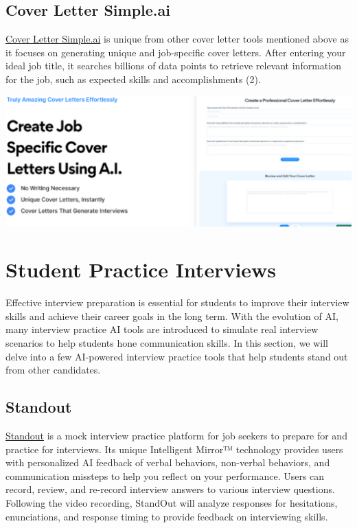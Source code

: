 \documentclass[
]{book}
\begin{document}
\hypertarget{cover-letter-simple.ai}{%
\section{Cover Letter Simple.ai}\label{cover-letter-simple.ai}}

\href{https://coverlettersimple.ai/}{Cover Letter Simple.ai} is unique from other cover letter tools mentioned above as it focuses on generating unique and job-specific cover letters. After entering your ideal job title, it searches billions of data points to retrieve relevant information for the job, such as expected skills and accomplishments (2).

\includegraphics[width=6.80208in,height=\textheight]{coverlettsimpleai pic.png}

\hypertarget{student-practice-interviews}{%
\chapter{Student Practice Interviews}\label{student-practice-interviews}}

Effective interview preparation is essential for students to improve their interview skills and achieve their career goals in the long term. With the evolution of AI, many interview practice AI tools are introduced to simulate real interview scenarios to help students hone communication skills. In this section, we will delve into a few AI-powered interview practice tools that help students stand out from other candidates.

\hypertarget{standout}{%
\section{Standout}\label{standout}}

\href{https://standout.com/}{Standout} is a mock interview practice platform for job seekers to prepare for and practice for interviews. Its unique Intelligent Mirror™ technology provides users with personalized AI feedback of verbal behaviors, non-verbal behaviors, and communication missteps to help you reflect on your performance. Users can record, review, and re-record interview answers to various interview questions. Following the video recording, StandOut will analyze responses for hesitations, enunciations, and response timing to provide feedback on interviewing skills.
\end{document}
